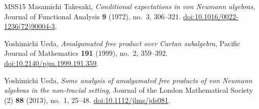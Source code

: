 \begin{thebibliography}{MSS15}
Masamichi Takesaki,
\emph{Conditional expectations in von Neumann algebras},
Journal of Functional Analysis \textbf{9} (1972), no.~3, 306--321.
\href{https://doi.org/10.1016/0022-1236(72)90004-3}{doi:10.1016/0022-1236(72)90004-3}.

Yoshimichi Ueda,
\emph{Amalgamated free product over Cartan subalgebra},
Pacific Journal of Mathematics \textbf{191} (1999), no.~2, 359--392.
\href{https://doi.org/10.2140/pjm.1999.191.359}{doi:10.2140/pjm.1999.191.359}.

Yoshimichi Ueda,
\emph{Some analysis of amalgamated free products of von Neumann algebras in the non-tracial setting},
Journal of the London Mathematical Society (2) \textbf{88} (2013), no.~1, 25--48.
\href{https://doi.org/10.1112/jlms/jds081}{doi:10.1112/jlms/jds081}.

\end{thebibliography}
